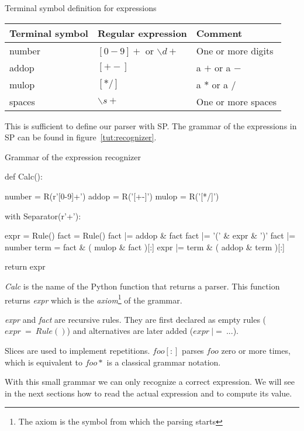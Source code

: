 \begin{tableau}
\caption{Terminal symbol definition for expressions}        \label{tut:token_calc}
\begin{tabular}{| l | l | l |}
\hline
    Terminal symbol & Regular expression & Comment \\
\hline
\hline
    number & $[0-9]+$ or $\backslash d+$ & One or more digits \\
\hline
    addop & $[+-]$ & a $+$ or a $-$ \\
\hline
    mulop & $[*/]$ & a $*$ or a $/$ \\
\hline
    spaces & $\backslash s+$ & One or more spaces \\
\hline
\end{tabular}
\end{tableau}

This is sufficient to define our parser with SP. The grammar of the expressions in SP can be found in figure~\ref{tut:recognizer}.

\begin{code}
\caption{Grammar of the expression recognizer}              \label{tut:recognizer}
\begin{verbatimtab}[4]
def Calc():

    number = R(r'[0-9]+')
    addop = R('[+-]')
    mulop = R('[*/]')

    with Separator(r'\s+'):

        expr = Rule()
        fact = Rule()
        fact |= addop & fact
        fact |= '(' & expr & ')'
        fact |= number
        term = fact & ( mulop & fact )[:]
        expr |= term & ( addop & term )[:]

    return expr

\end{verbatimtab}
\end{code}

\emph{Calc} is the name of the Python function that returns a parser. This function returns \emph{expr} which is the \emph{axiom}\footnote{The axiom is the symbol from which the parsing starts} of the grammar.

\emph{expr} and \emph{fact} are recursive rules. They are first declared as empty rules ($expr~=~Rule()$) and alternatives are later added ($expr~|=~...$).

Slices are used to implement repetitions. $foo[:]$ parses $foo$ zero or more times, which is equivalent to $foo*$ is a classical grammar notation.

With this small grammar we can only recognize a correct expression. We will see in the next sections how to read the actual expression and to compute its value.


